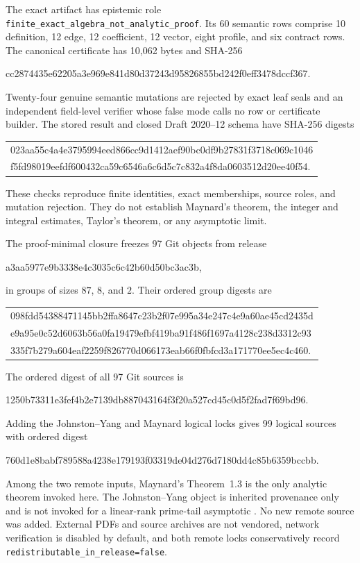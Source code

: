 \documentclass[11pt]{article}
\theoremstyle{definition}
\theoremstyle{remark}
\begin{document}
The exact artifact has epistemic role
\texttt{finite\_exact\_algebra\_not\_analytic\_proof}.  Its 60 semantic
rows comprise 10 definition, 12 edge, 12 coefficient, 12 vector, eight
profile, and six contract rows.  The canonical certificate has 10,062
bytes and SHA-256
\begin{center}
\small\ttfamily
cc2874435e62205a3e969e841d80d37243d95826855bd242f0eff3478dccf367.
\end{center}
Twenty-four genuine semantic mutations are rejected by exact leaf seals
and an independent field-level verifier whose false mode calls no row or
certificate builder.  The stored result and closed Draft 2020--12 schema
have SHA-256 digests
\begin{center}
\small\ttfamily
\begin{tabular}{@{}l@{}}
023aa55c4a4e3795994eed866cc9d1412aef90bc0df9b27831f3718c069c1046\\
f5fd98019eefdf600432ca59c6546a6c6d5c7c832a4f8da0603512d20ee40f54.
\end{tabular}
\end{center}
These checks reproduce finite identities, exact memberships, source
roles, and mutation rejection.  They do not establish Maynard's
theorem, the integer and integral estimates, Taylor's theorem, or any
asymptotic limit.

The proof-minimal closure freezes 97 Git objects from release
\begin{center}
\small\ttfamily
a3aa5977e9b3338e4c3035c6c42b60d50bc3ac3b,
\end{center}
in groups of sizes $87$, $8$, and $2$.  Their ordered group digests are
\begin{center}
\small\ttfamily
\begin{tabular}{@{}l@{}}
098fdd54388471145bb2ffa8647c23b2f07e995a34e247c4e9a60ae45cd2435d\\
e9a95e0c52d6063b56a0fa19479efbf419ba91f486f1697a4128c238d3312c93\\
335f7b279a604eaf2259f826770d066173eab66f0fbfcd3a171770ee5ec4c460.
\end{tabular}
\end{center}
The ordered digest of all 97 Git sources is
\begin{center}
\small\ttfamily
1250b73311e3fef4b2e7139db887043164f3f20a527cd45c0d5f2fad7f69bd96.
\end{center}
Adding the Johnston--Yang and Maynard logical locks gives 99 logical
sources with ordered digest
\begin{center}
\small\ttfamily
760d1e8babf789588a4238e179193f03319de04d276d7180dd4c85b6359bccbb.
\end{center}
Among the two remote inputs, Maynard's Theorem~1.3 is the only analytic
theorem invoked here.  The
Johnston--Yang object is inherited provenance only and is not invoked
for a linear-rank prime-tail asymptotic \cite{JohnstonYang2023}.  No new
remote source was added.  External PDFs and source archives are not
vendored, network verification is disabled by default, and both remote
locks conservatively record
\texttt{redistributable\_in\_release=false}.
\end{document}
